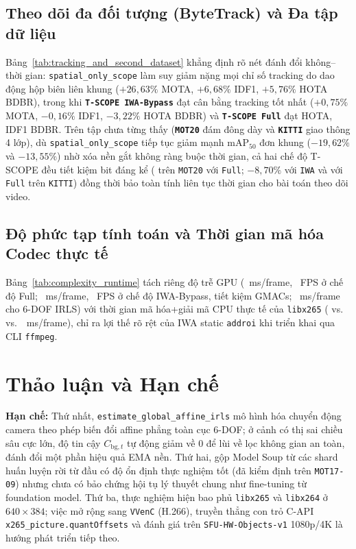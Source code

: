 \documentclass[journal]{IEEEtran}
\begin{document}
\subsection{Theo dõi đa đối tượng (ByteTrack) và Đa tập dữ liệu}
Bảng~\ref{tab:tracking_and_second_dataset} khẳng định rõ nét đánh đổi không--thời gian: \texttt{spatial\_only\_scope} làm suy giảm nặng mọi chỉ số tracking do dao động hộp biên liên khung ($+26{,}63\%$ MOTA, $+6{,}68\%$ IDF1, $+5{,}76\%$ HOTA BDBR), trong khi \textbf{\texttt{T-SCOPE IWA-Bypass}} đạt cân bằng tracking tốt nhất ($+0{,}75\%$ MOTA, $-0{,}16\%$ IDF1, $-3{,}22\%$ HOTA BDBR) và \textbf{\texttt{T-SCOPE Full}} đạt \tscopeMotHotaBdbr{} HOTA, \tscopeMotIdfOneBdbr{} IDF1 BDBR. Trên tập chưa từng thấy (\textbf{\texttt{MOT20}} đám đông dày và \textbf{\texttt{KITTI}} giao thông 4 lớp), dù \texttt{spatial\_only\_scope} tiếp tục giảm mạnh $\mathrm{mAP}_{50}$ đơn khung ($-19{,}62\%$ và $-13{,}55\%$) nhờ xóa nền gắt không ràng buộc thời gian, cả hai chế độ T-SCOPE đều tiết kiệm bit đáng kể (\tscopeMotTwentyMapFiftyBdbr{} trên \texttt{MOT20} với \texttt{Full}; $-8{,}70\%$ với \texttt{IWA} và \tscopeKittiMapFiftyBdbr{} với \texttt{Full} trên \texttt{KITTI}) đồng thời bảo toàn tính liên tục thời gian cho bài toán theo dõi video.

\subsection{Độ phức tạp tính toán và Thời gian mã hóa Codec thực tế}
Bảng~\ref{tab:complexity_runtime} tách riêng độ trễ GPU (\tscopeFullMeanMs{}~ms/frame, \tscopeFullFps{}~FPS ở chế độ Full; \tscopeIwaMeanMs{}~ms/frame, \tscopeIwaFps{}~FPS ở chế độ IWA-Bypass, tiết kiệm \tscopeIwaAnalyticalGmacSaving{} GMACs; \tscopeIrlsMeanMs{}~ms/frame cho 6-DOF IRLS) với thời gian mã hóa+giải mã CPU thực tế của \texttt{libx265} (\tscopeAnchorEncMs{} vs.\ \tscopeIwaStatEncMs{} vs.\ \tscopeFullDynEncMs{}~ms/frame), chỉ ra lợi thế rõ rệt của IWA static \texttt{addroi} khi triển khai qua CLI \texttt{ffmpeg}.

\section{Thảo luận và Hạn chế}
\label{sec:discussion}

\textbf{Hạn chế:} Thứ nhất, \texttt{estimate\_global\_affine\_irls} mô hình hóa chuyển động camera theo phép biến đổi affine phẳng toàn cục 6-DOF; ở cảnh có thị sai chiều sâu cực lớn, độ tin cậy $C_{\mathrm{bg},t}$ tự động giảm về $0$ để lùi về lọc không gian an toàn, đánh đổi một phần hiệu quả EMA nền. Thứ hai, gộp Model Soup từ các shard huấn luyện rời từ đầu có độ ổn định thực nghiệm tốt (đã kiểm định trên \texttt{MOT17-09}) nhưng chưa có bảo chứng hội tụ lý thuyết chung như fine-tuning từ foundation model. Thứ ba, thực nghiệm hiện bao phủ \texttt{libx265} và \texttt{libx264} ở $640\times 384$; việc mở rộng sang \texttt{VVenC} (H.266), truyền thẳng con trỏ C-API \texttt{x265\_picture.quantOffsets} và đánh giá trên \texttt{SFU-HW-Objects-v1} 1080p/4K là hướng phát triển tiếp theo.
\end{document}
